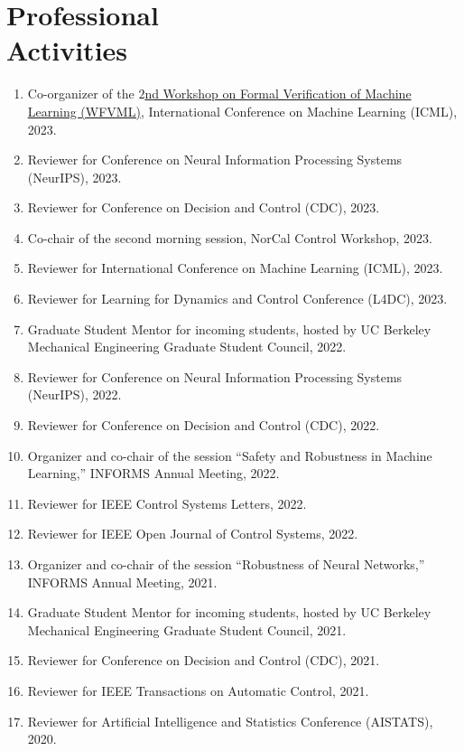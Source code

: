 \documentclass[11pt]{article}
\begin{document}
	\section{\texorpdfstring{Professional \\[\baselineskip] Activities}{Professional Activities}}
	\hfill\vspace*{-2\baselineskip}
	\begin{enumerate}[label={\arabic*.}]
		\item Co-organizer of the \href{https://www.ml-verification.com/}{$2$nd Workshop on Formal Verification of Machine Learning (WFVML)}, International Conference on Machine Learning (ICML), 2023.
		\item Reviewer for Conference on Neural Information Processing Systems (NeurIPS), 2023.
		\item Reviewer for Conference on Decision and Control (CDC), 2023.
		\item Co-chair of the second morning session, NorCal Control Workshop, 2023.
		\item Reviewer for International Conference on Machine Learning (ICML), 2023.
		\item Reviewer for Learning for Dynamics and Control Conference (L4DC), 2023.
		\item Graduate Student Mentor for incoming students, hosted by UC Berkeley Mechanical Engineering Graduate Student Council, 2022.
		\item Reviewer for Conference on Neural Information Processing Systems (NeurIPS), 2022.
		\item Reviewer for Conference on Decision and Control (CDC), 2022.
		\item Organizer and co-chair of the session ``Safety and Robustness in Machine Learning,'' INFORMS Annual Meeting, 2022.
		\item Reviewer for IEEE Control Systems Letters, 2022.
		\item Reviewer for IEEE Open Journal of Control Systems, 2022.
		\item Organizer and co-chair of the session ``Robustness of Neural Networks,'' INFORMS Annual Meeting, 2021.
		\item Graduate Student Mentor for incoming students, hosted by UC Berkeley Mechanical Engineering Graduate Student Council, 2021.
		\item Reviewer for Conference on Decision and Control (CDC), 2021.
		\item Reviewer for IEEE Transactions on Automatic Control, 2021.
		\item Reviewer for Artificial Intelligence and Statistics Conference (AISTATS), 2020.

\end{enumerate}
\end{document}
